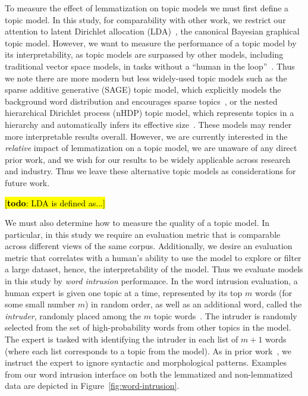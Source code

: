 \documentclass[11pt,letterpaper]{article}
\newcommand{\Note}[3]{\sethlcolor{#2}\hl{[\textbf{#1}: #3]}}
\newcommand{\todo}[1]{\Note{todo}{red}{#1}}
\begin{document}
{To measure the effect of lemmatization on topic models we must first
define a topic model.  In this study, for comparability with other
work, we restrict our attention to latent Dirichlet allocation
(LDA)~\cite{blei2003}, the canonical Bayesian graphical topic model.
However, we want to measure the performance of a topic model by its
interpretability, as topic models are surpassed by other models,
including traditional vector space models, in tasks without a ``human
in the loop''~\cite{may2015}.  Thus we note there are more modern but
less widely-used topic models such as the sparse additive generative
(SAGE) topic model, which explicitly models the background word
distribution and encourages sparse topics~\cite{eisenstein2009}, or the
nested hierarchical Dirichlet process (nHDP) topic model, which
represents topics in a hierarchy and automatically infers its effective
size~\cite{paisley2015}.  These models may render more interpretable
results overall.  However, we are currently interested in the
\emph{relative} impact of lemmatization on a topic model, we are
unaware of any direct prior work, and we wish for our results to be
widely applicable across research and industry.  Thus we leave these
alternative topic models as considerations for future work.

\todo{LDA is defined as...}

We must also determine how to measure the quality of a
topic model.  In particular, in this study we require an evaluation
metric that is comparable across different views of the same corpus.
Additionally, we desire an evaluation metric that correlates with a
human's ability to use the model to explore or filter a large dataset,
hence, the interpretability of the model.  Thus we evaluate models in
this study by \emph{word intrusion} performance.  In the word intrusion
evaluation, a human expert is given one topic at a time, represented
by its top $m$ words (for some small number $m$) in random order, as
well as an additional word, called the \emph{intruder}, randomly placed
among the $m$ topic words~\cite{chang2009}.
The intruder is randomly selected from the set of high-probability
words from other topics in the model.
The expert is tasked with identifying the intruder in each list of
$m + 1$ words (where each list corresponds to a topic from the model).
As in prior work~\cite{chang2009}, we instruct the expert to ignore
syntactic and morphological patterns.  Examples from our word
intrusion interface on both the lemmatized and non-lemmatized data
are depicted in Figure~\ref{fig:word-intrusion}.

}
\end{document}
